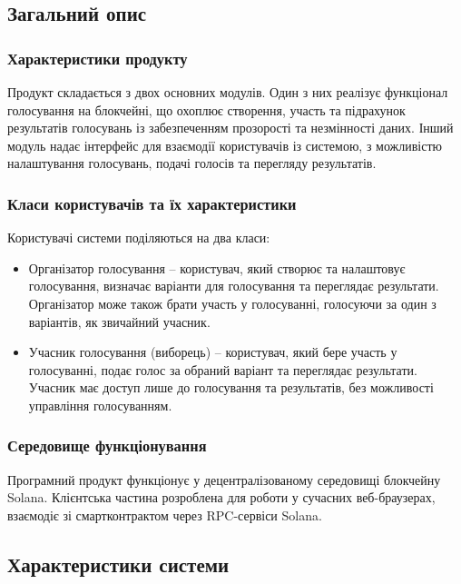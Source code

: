 \documentclass[14pt]{extreport}
\begin{document}
  
  \subsection{Загальний опис}
  \subsubsection{Характеристики продукту}  
  Продукт складається з двох основних модулів. Один з них реалізує функціонал голосування на блокчейні, що охоплює створення, участь та підрахунок результатів голосувань із забезпеченням прозорості та незмінності даних. Інший модуль надає інтерфейс для взаємодії користувачів із системою, з можливістю налаштування голосувань, подачі голосів та перегляду результатів.
  
  \subsubsection{Класи користувачів та їх характеристики}
  Користувачі системи поділяються на два класи:
  \begin{itemize}
    \item Організатор голосування – користувач, який створює та налаштовує голосування, визначає варіанти для голосування та переглядає результати. Організатор може також брати участь у голосуванні, голосуючи за один з варіантів, як звичайний учасник.
    \item Учасник голосування (виборець) – користувач, який бере участь у голосуванні, подає голос за обраний варіант та переглядає результати. Учасник має доступ лише до голосування та результатів, без можливості управління голосуванням.
  \end{itemize}
  
  \subsubsection{Середовище функціонування}
  Програмний продукт функціонує у децентралізованому середовищі блокчейну Solana. Клієнтська частина розроблена для роботи у сучасних веб-браузерах, взаємодіє зі смартконтрактом через RPC-сервіси Solana.

  \subsection{Характеристики системи}
\end{document}
